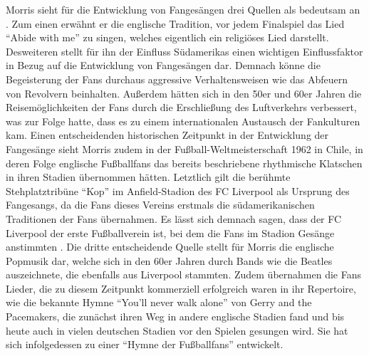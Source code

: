 Morris sieht für die Entwicklung von Fangesängen drei Quellen als bedeutsam an \cite[S. 65]{RK98}.
Zum einen erwähnt er die englische Tradition, vor jedem Finalspiel das Lied "`Abide with me"' zu singen, welches eigentlich ein religiöses Lied darstellt.
Desweiteren stellt für ihn der Einfluss Südamerikas einen wichtigen Einflussfaktor in Bezug auf die Entwicklung von Fangesängen dar.
Demnach könne die Begeisterung der Fans durchaus aggressive Verhaltensweisen wie das Abfeuern von Revolvern beinhalten.
Außerdem hätten sich in den 50er und 60er Jahren die Reisemöglichkeiten der Fans durch die Erschließung des Luftverkehrs verbessert, was zur Folge hatte, dass es zu einem internationalen Austausch der Fankulturen kam.
Einen entscheidenden historischen Zeitpunkt in der Entwicklung der Fangesänge sieht Morris zudem in der Fußball-Weltmeisterschaft 1962 in Chile, in deren Folge englische Fußballfans das bereits beschriebene rhythmische Klatschen in ihren Stadien übernommen hätten.
Letztlich gilt die berühmte Stehplatztribüne "`Kop"' im Anfield-Stadion des FC Liverpool als Ursprung des Fangesangs, da die Fans dieses Vereins erstmals die südamerikanischen Traditionen der Fans übernahmen.
Es lässt sich demnach sagen, dass der FC Liverpool der erste Fußballverein ist, bei dem die Fans im Stadion Gesänge anstimmten \cite[S. 28]{JK07}.
Die dritte entscheidende Quelle stellt für Morris die englische Popmusik dar, welche sich in den 60er Jahren durch Bands wie die Beatles auszeichnete, die ebenfalls aus Liverpool stammten.
Zudem übernahmen die Fans Lieder, die zu diesem Zeitpunkt kommerziell erfolgreich waren in ihr Repertoire, wie die bekannte Hymne "`You'll never walk alone"' von Gerry and the Pacemakers, die zunächst ihren Weg in andere englische Stadien fand und bis heute auch in vielen deutschen Stadien vor den Spielen gesungen wird.
Sie hat sich infolgedessen zu einer "`Hymne der Fußballfans"' entwickelt.

